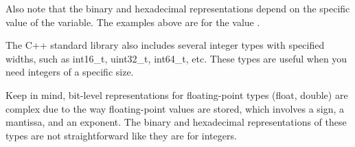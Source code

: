 Also note that the binary and hexadecimal representations depend on the specific value of the variable. The examples above are for the value {}.

The C++ standard library also includes several integer types with specified widths, such as {\ttfamily int16\+\_\+t}, {\ttfamily uint32\+\_\+t}, {\ttfamily int64\+\_\+t}, etc. These types are useful when you need integers of a specific size.

Keep in mind, bit-\/level representations for floating-\/point types ({\ttfamily float}, {\ttfamily double}) are complex due to the way floating-\/point values are stored, which involves a sign, a mantissa, and an exponent. The binary and hexadecimal representations of these types are not straightforward like they are for integers. 
